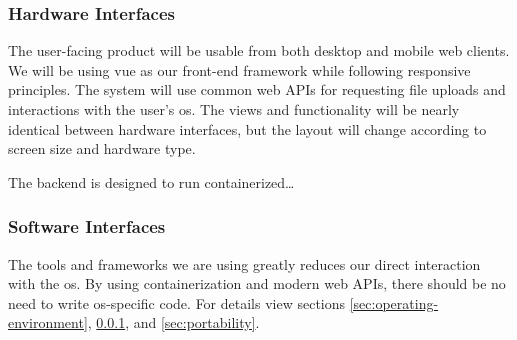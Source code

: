         \subsubsection{Hardware Interfaces}\label{sec:hardware-interfaces}
            The user-facing product will be usable from both desktop and mobile web clients. We will be using \gls{vue} as our front-end framework while following \gls{responsive} principles. The system will use common web APIs for requesting file uploads and interactions with the user's \gls{os}. The views and functionality will be nearly identical between hardware interfaces, but the layout will change according to screen size and hardware type.
            \par The backend is designed to run containerized\dots %
        \subsubsection{Software Interfaces}\label{sec:software-interfaces}
            The tools and frameworks we are using greatly reduces our direct interaction with the \gls{os}. By using containerization and modern web APIs, there should be no need to write \gls{os}-specific code. For details view sections \ref{sec:operating-environment}, \ref{sec:hardware-interfaces}, and \ref{sec:portability}.
